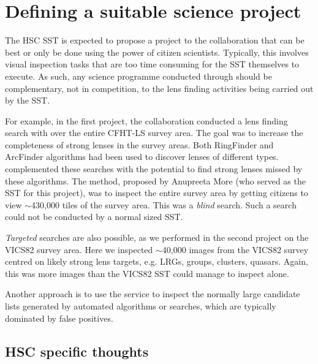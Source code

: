 \documentclass[a4paper,twocolumn]{article}
\begin{document}


\section{Defining a suitable \sw science project}
\label{sec:project}

The HSC SST is expected to propose a project to the \SW collaboration
that can be best or only be done using the power of citizen
scientists. Typically, this involves visual inspection tasks that are
too time consuming for the SST themselves to execute. As such, any
science programme conducted through \SW should be complementary, not
in competition, to the lens finding activities being carried out by
the SST.

For example, in the first \SW project, the collaboration conducted a
lens finding search with \SW over the entire CFHT-LS survey area. The
goal was to increase the completeness of strong lenses in the survey
areas. Both RingFinder and ArcFinder algorithms had been used to
discover lenses of different types. \SW complemented these searches
with the potential to find strong lenses missed by these
algorithms. The method, proposed by Anupreeta More (who served as the
SST for this project), was to inspect the entire survey area by
getting citizens to view $\sim$430,000 tiles of the survey area. This
was a \textit{blind} search. Such a search could not be conducted by a
normal sized SST.

\textit{Targeted} searches are also possible, as we performed in the
second \SW project on the VICS82 survey area. Here we inspected
$\sim$40,000 images from the VICS82 survey centred on likely strong
lens targets, e.g. LRGs, groups, clusters, quasars.  Again, this was
more images than the VICS82 SST could manage to inspect alone.

Another approach is to use the \SW service to inspect the normally
large candidate lists generated by automated algorithms or searches,
which are typically dominated by false positives.

\subsection{HSC specific thoughts}
\end{document}

